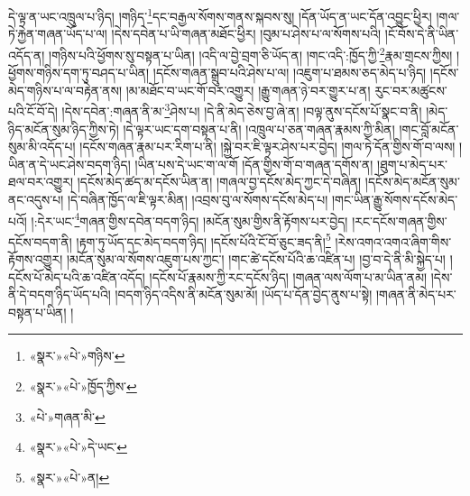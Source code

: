 དེ་ལྟ་ན་ཡང་འཁྲུལ་པ་ཉིད། །གཉིད་\footnote{«སྣར་»«པེ་»གཉིས་}དང་བརྒྱལ་སོགས་གནས་སྐབས་སུ། །དོན་ཡོད་ན་ཡང་དོན་འབྱུང་ཕྱིར། །གལ་ཏེ་རྐྱེན་གཞན་ཡོད་པ་ལ། །དེས་དབེན་པ་ཡི་གཞན་མཐོང་ཕྱིར། །བུམ་པ་ཤེས་པ་ལ་སོགས་པའི། །ངོ་བོས་དེ་ནི་ཡིན་འདོད་ན། །གཉིས་པའི་ཕྱོགས་སུ་བསྟན་པ་ཡིན། །འདི་ལ་བྱེ་བྲག་ཅི་ཡོད་ན། །གང་འདི་:ཁྱོད་ཀྱི་\footnote{«སྣར་»«པེ་»ཁྱོད་ཀྱིས་}རྣམ་གྲངས་ཀྱིས། །ཕྱོགས་གཉིས་དག་ཏུ་བཤད་པ་ཡིན། །དངོས་གཞན་སྒྲུབ་པའི་ཤེས་པ་ལ། །འཇུག་པ་ཐམས་ཅད་མེད་པ་ཉིད། །དངོས་མེད་གཉིས་པ་ལ་བརྟེན་ནས། །མ་མཐོང་བ་ཡང་གོ་བར་འགྱུར། །རྒྱུ་གཞན་ཉེ་བར་གྱུར་པ་ན། རུང་བར་མཚུངས་པའི་ངོ་བོ་དེ། །དེས་དབེན་:གཞན་ནི་མ་\footnote{«པེ་»གཞན་མི་}ཤེས་པ། །དེ་ནི་མེད་ཅེས་བྱ་ཞེ་ན། །བལྟ་ནུས་དངོས་པོ་སྣང་བ་ནི། །མེད་ཉིད་མངོན་སུམ་ཉིད་ཀྱིས་ཏེ། །དེ་ལྟར་ཡང་དག་བསྟན་པ་ནི། །འཁྲུལ་པ་ཅན་གཞན་རྣམས་ཀྱི་མིན། །གང་བློ་མངོན་སུམ་མི་འདོད་པ། །དངོས་གཞན་རྣམ་པར་རིག་པ་ནི། །སྐྱེ་བར་ཇི་ལྟར་ཤེས་པར་བྱེད། །གལ་ཏེ་དོན་གྱིས་གོ་བ་ལས། །ཡིན་ན་དེ་ཡང་ཤེས་བདག་ཉིད། །ཡིན་པས་དེ་ཡང་ག་ལ་གོ །དོན་གྱིས་གོ་བ་གཞན་དགོས་ན། །ཐུག་པ་མེད་པར་ཐལ་བར་འགྱུར། །དངོས་མེད་ཚད་མ་དངོས་ཡིན་ན། །གཞལ་བྱ་དངོས་མེད་ཀྱང་དེ་བཞིན། །དངོས་མེད་མངོན་སུམ་ནང་འདུས་པ། །དེ་བཞིན་ཁྱོད་ལ་ཇི་ལྟར་མིན། །འབྲས་བུ་ལ་སོགས་དངོས་མེད་པ། །གང་ཡིན་རྒྱུ་སོགས་དངོས་མེད་པའོ། །:དེར་ཡང་\footnote{«སྣར་»«པེ་»དེ་ཡང་}གཞན་གྱིས་དབེན་བདག་ཉིད། །མངོན་སུམ་གྱིས་ནི་རྟོགས་པར་བྱེད། །རང་དངོས་གཞན་གྱིས་དངོས་བདག་ནི། །རྟག་ཏུ་ཡོད་དང་མེད་བདག་ཉིད། །དངོས་པོའི་ངོ་བོ་ཅུང་ཟད་ནི།\footnote{«སྣར་»«པེ་»ན།} །རེས་འགའ་འགའ་ཞིག་གིས་རྟོགས་འགྱུར། །མངོན་སུམ་ལ་སོགས་འཇུག་པས་ཀྱང་། །གང་ཚེ་དངོས་པོའི་ཆ་འཛིན་པ། །བྱ་བ་དེ་ནི་མི་སྐྱེད་པ། །དངོས་པོ་མེད་པའི་ཆ་འཛིན་འདོད། །དངོས་པོ་རྣམས་ཀྱི་རང་དངོས་ཉིད། །གཞན་ལས་ལོག་པ་མ་ཡིན་ནམ། །དེས་ནི་དེ་བདག་ཉིད་ཡོད་པའི། །བདག་ཉིད་འདིས་ནི་མངོན་སུམ་མོ། །ཡོད་པ་དོན་བྱེད་ནུས་པ་སྟེ། །གཞན་ནི་མེད་པར་བསྟན་པ་ཡིན། །
